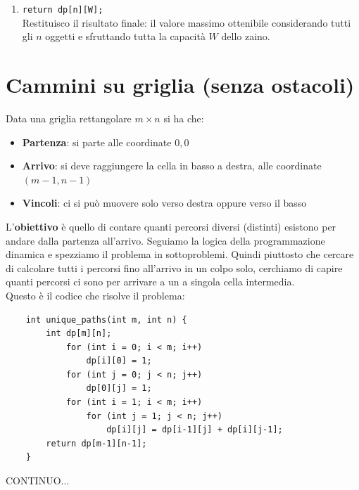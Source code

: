 \begin{enumerate}
     massimo dalla funzione \texttt{fmax} rispetto al valore che avremmo ottenuto prendendo l'oggetto. Siccome non prendiamo l'oggetto l'indice $w$ rimane invariato, in quanto il peso corrente non cambia.\smallskip\\
     Invece se prendiamo l'oggetto, impostiamo che \texttt{d[i][w] = dp[i-1][w - peso[i-1]] + valore[i-1]}. Siccome stiamo prendendo l'oggetto, dobbiamo considerare due cose: la prima è aggiungere il valore dell'oggetto che 
     prendiamo, e questo lo facciamo sommando \texttt{valore[i-1]}, la seconda è che ora il peso disponibile diminuisce visto che abbiamo preso l'oggetto e quindi dobbiamo sottrarre alla capacità corrente (\texttt{w}) il
    peso dell'oggetto che prendiamo (\texttt{peso[i-1]}), quindi scriviamo \texttt{w - peso[i-1]}.
    \item \texttt{return dp[n][W];}\\
    Restituisco il risultato finale: il valore massimo ottenibile considerando tutti gli $n$ oggetti e sfruttando tutta la capacità $W$ dello zaino.
\end{enumerate}


\section{Cammini su griglia (senza ostacoli)}
Data una griglia rettangolare $m \times n$ si ha che:
\begin{itemize}
    \item \textbf{Partenza}: si parte alle coordinate $0,0$
    \item \textbf{Arrivo}: si deve raggiungere la cella in basso a destra, alle coordinate $(m-1,n-1)$
    \item \textbf{Vincoli}: ci si può muovere solo verso destra oppure verso il basso 
\end{itemize}
L'\textbf{obiettivo} è quello di contare quanti percorsi diversi (distinti) esistono per andare dalla partenza all'arrivo. 
Seguiamo la logica della programmazione dinamica e spezziamo il problema in sottoproblemi. Quindi piuttosto che cercare di calcolare 
tutti i percorsi fino all'arrivo in un colpo solo, cerchiamo di capire quanti percorsi ci sono per arrivare a un a singola cella intermedia.\smallskip\\

\noindent Questo è il codice che risolve il problema:
\begin{verbatim}
    int unique_paths(int m, int n) {
        int dp[m][n];
            for (int i = 0; i < m; i++)
                dp[i][0] = 1;
            for (int j = 0; j < n; j++)
                dp[0][j] = 1;
            for (int i = 1; i < m; i++)
                for (int j = 1; j < n; j++)
                    dp[i][j] = dp[i-1][j] + dp[i][j-1];
        return dp[m-1][n-1];
    }
\end{verbatim}

\noindent CONTINUO...



